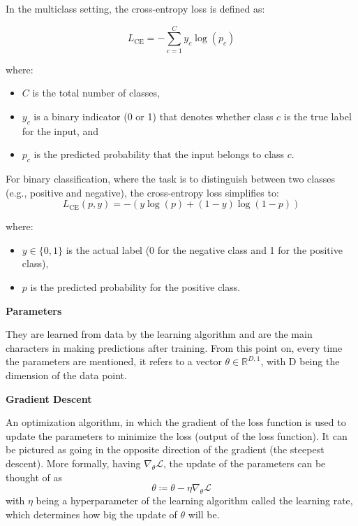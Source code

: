 In the multiclass setting, the cross-entropy loss is defined as:

\begin{equation}
    L_{\text{CE}} = - \sum_{c=1}^{C} y_c \log(p_c)
\end{equation}

where:
\begin{itemize}
    \item \( C \) is the total number of classes,
    \item \( y_c \) is a binary indicator (0 or 1) that denotes whether class \( c \) is the true label for the input, and
    \item \( p_c \) is the predicted probability that the input belongs to class \( c \).
\end{itemize}

For binary classification, where the task is to distinguish between two classes (e.g., positive and negative), the cross-entropy loss simplifies to:
\begin{equation}
L_{\text{CE}}(p, y) = - \left( y \log(p) + (1 - y) \log(1 - p) \right)
\end{equation}


where:
\begin{itemize}
    \item \( y \in \{0, 1\} \) is the actual label (0 for the negative class and 1 for the positive class),
    \item \( p \) is the predicted probability for the positive class.
\end{itemize}

    
    \textbf{Parameters}
    
    They are learned from data by the learning algorithm and are the main characters in making predictions after training. From this point on, every time the parameters are mentioned, it refers to a vector $\theta \in \mathbb{R} ^ {D, 1}$, with D being the dimension of the data point.
    
    \textbf{Gradient Descent}

    An optimization algorithm, in which the gradient of the loss function is used to update the parameters to minimize the loss (output of the loss function). It can be pictured as going in the opposite direction of the gradient (the steepest descent). More formally, having  $\nabla_\theta \mathcal{L}$, the update of the parameters can be thought of as 
    \begin{equation}
        \theta \coloneq \theta - \eta \nabla_\theta \mathcal{L}
    \end{equation}
    with \(\eta\) being a hyperparameter of the learning algorithm called the learning rate, which determines how big the update of $\theta$ will be.


